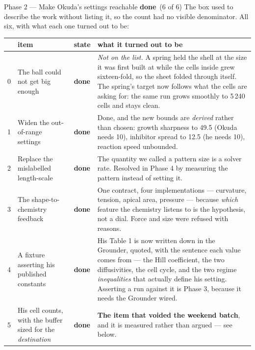 \documentclass[11pt,a4paper]{article}
\newcommand{\dn}{\textcolor{good}{\textbf{done}}}
\begin{document}
\begin{phasebox}{Phase 2 --- Make Okuda's settings reachable \hfill \dn\ (6 of 6)}
The box used to describe the work without listing it, so the count had no visible
denominator. All six, with what each one turned out to be:

\footnotesize
\begin{tabular}{@{}r@{.\ }p{5.0cm} l p{6.3cm}@{}}
\toprule
& \textbf{item} & \textbf{state} & \textbf{what it turned out to be}\\
\midrule
0 & The ball could not get big enough & \dn &
  \emph{Not on the list.} A spring held the shell at the size it was first built at while the cells
  inside grew sixteen-fold, so the sheet folded through itself. The spring's target now follows
  what the cells are asking for: the same run grows smoothly to 5\,240 cells and stays clean.\\
1 & Widen the out-of-range settings & \dn &
  Done, and the new bounds are \emph{derived} rather than chosen: growth sharpness to 49.5
  (Okuda needs 10), inhibitor spread to 12.5 (he needs 10), reaction speed unbounded.\\
2 & Replace the mislabelled length-scale & \dn &
  The quantity we called a pattern size is a solver rate. Resolved in Phase 4 by measuring the
  pattern instead of setting it.\\
3 & The shape-to-chemistry feedback & \dn &
  One contract, four implementations --- curvature, tension, apical area, pressure --- because
  \emph{which} feature the chemistry listens to is the hypothesis, not a dial. Force and size were
  refused with reasons.\\
4 & A fixture asserting his published constants & \dn &
  His Table 1 is now written down in the Grounder, quoted, with the sentence each value comes
  from --- the Hill coefficient, the two diffusivities, the cell cycle, and the two regime
  \emph{inequalities} that actually define his setting. Asserting a run against it is Phase 3,
  because it needs the Grounder wired.\\
5 & His cell counts, with the buffer sized for the \emph{destination} & \dn &
  \textbf{The item that voided the weekend batch}, and it is measured rather than argued ---
  see below.\\
\bottomrule
\end{tabular}

\normalsize
\end{phasebox}
\end{document}
